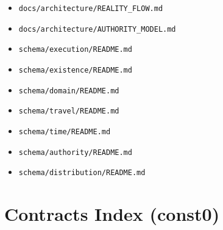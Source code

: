 \documentclass[9pt,a4paper,openany]{book}
\begin{document}
\begin{itemize}
\item \texttt{docs/\allowbreak{}architecture/\allowbreak{}REALITY\_\allowbreak{}FLOW.\allowbreak{}md}
\end{itemize}


\begin{itemize}
\item \texttt{docs/\allowbreak{}architecture/\allowbreak{}AUTHORITY\_\allowbreak{}MODEL.\allowbreak{}md}
\end{itemize}


\begin{itemize}
\item \texttt{schema/\allowbreak{}execution/\allowbreak{}README.\allowbreak{}md}
\end{itemize}


\begin{itemize}
\item \texttt{schema/\allowbreak{}existence/\allowbreak{}README.\allowbreak{}md}
\end{itemize}


\begin{itemize}
\item \texttt{schema/\allowbreak{}domain/\allowbreak{}README.\allowbreak{}md}
\end{itemize}


\begin{itemize}
\item \texttt{schema/\allowbreak{}travel/\allowbreak{}README.\allowbreak{}md}
\end{itemize}


\begin{itemize}
\item \texttt{schema/\allowbreak{}time/\allowbreak{}README.\allowbreak{}md}
\end{itemize}


\begin{itemize}
\item \texttt{schema/\allowbreak{}authority/\allowbreak{}README.\allowbreak{}md}
\end{itemize}


\begin{itemize}
\item \texttt{schema/\allowbreak{}distribution/\allowbreak{}README.\allowbreak{}md}
\end{itemize}



\section{Contracts Index (const0)}
\end{document}
